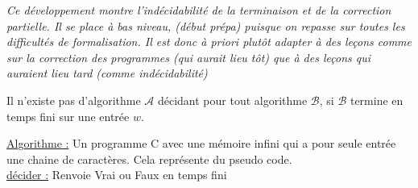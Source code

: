 
\textit{Ce développement montre l'indécidabilité de la terminaison et de la correction partielle. Il se place à bas niveau, (début prépa) puisque on repasse sur toutes les difficultés de formalisation. Il est donc à priori plutôt adapter à des leçons comme sur la correction des programmes (qui aurait lieu tôt) que à des leçons qui auraient lieu tard (comme indécidabilité)}

\begin{theorem}
	Il n'existe pas d'algorithme $\mathcal A$ décidant pour tout algorithme $\mathcal B$, si $\mathcal B$ termine en temps fini sur une entrée $w$.
\end{theorem}

\underline{Algorithme :} Un programme C avec une mémoire infini qui a pour seule entrée une chaine de caractères. Cela représente du pseudo code.\\
\underline{décider :} Renvoie Vrai ou Faux en temps fini
